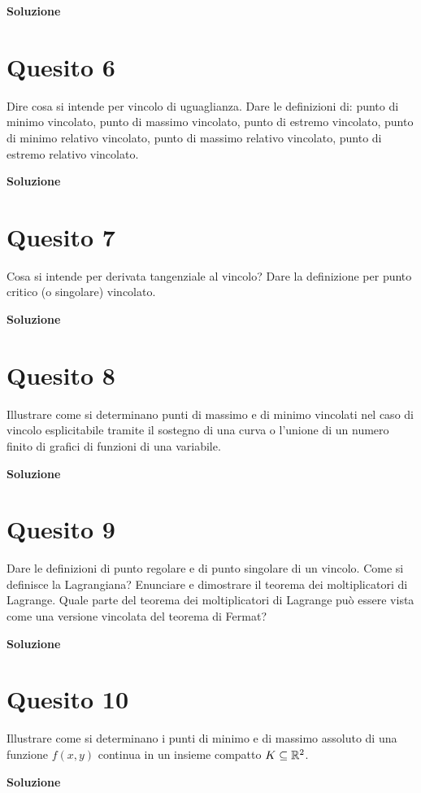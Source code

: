 \medskip
\begin{large}
\textbf{Soluzione}
\end{large}


\section*{Quesito 6}
Dire cosa si intende per vincolo di uguaglianza. Dare le definizioni di: punto
di minimo vincolato, punto di massimo vincolato, punto di estremo vincolato, punto di
minimo relativo vincolato, punto di massimo relativo vincolato, punto di estremo relativo
vincolato.


\medskip
\begin{large}
\textbf{Soluzione}
\end{large}


\section*{Quesito 7}
Cosa si intende per derivata tangenziale al vincolo? Dare la definizione per
punto critico (o singolare) vincolato.

\medskip
\begin{large}
\textbf{Soluzione}
\end{large}


\section*{Quesito 8}
Illustrare come si determinano punti di massimo e di minimo vincolati nel
caso di vincolo esplicitabile tramite il sostegno di una curva o l’unione di un numero finito
di grafici di funzioni di una variabile.


\medskip
\begin{large}
\textbf{Soluzione}
\end{large}


\section*{Quesito 9}
Dare le definizioni di punto regolare e di punto singolare di un vincolo. Come
si definisce la Lagrangiana? Enunciare e dimostrare il teorema dei moltiplicatori di Lagrange. Quale parte del teorema dei moltiplicatori di Lagrange può essere vista come una
versione vincolata del teorema di Fermat?


\medskip
\begin{large}
\textbf{Soluzione}
\end{large}


\section*{Quesito 10}
Illustrare come si determinano i punti di minimo e di massimo assoluto di
una funzione $f(x, y)$ continua in un insieme compatto $K\subseteq\mathbb{R}^2$.

\medskip
\begin{large}
\textbf{Soluzione}
\end{large}
